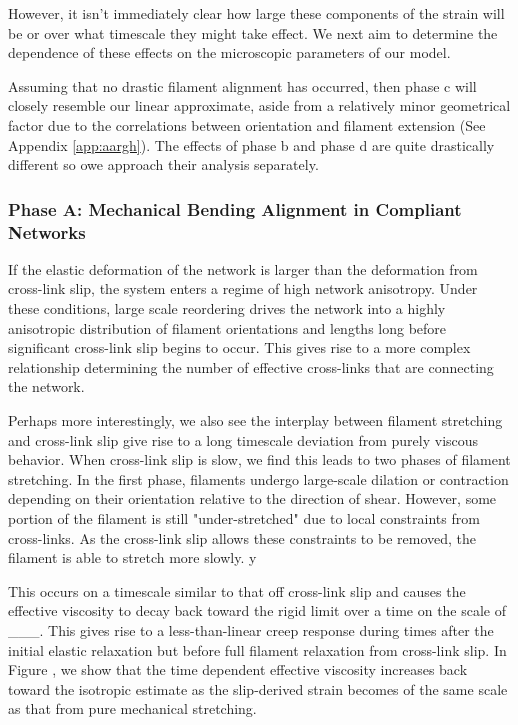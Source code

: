 \documentclass[pre,reprint]{revtex4-1}
\begin{document}
However, it isn't immediately clear how large these components of the strain will be or over what timescale they might take effect.  We next aim to determine the dependence of these effects on the microscopic parameters of our model.

Assuming that no drastic filament alignment has occurred, then phase c will closely resemble our linear approximate, aside from a relatively minor geometrical factor due to the correlations between orientation and filament extension (See Appendix \ref{app:aargh}).  The effects of phase b and phase d are quite drastically different so owe approach their analysis separately.

\subsubsection{Phase A: Mechanical Bending Alignment in Compliant Networks}
If the elastic deformation of the network is larger than the deformation from cross-link slip, the system enters a regime of high network anisotropy.  Under these conditions, large scale reordering drives the network into a highly anisotropic distribution of filament orientations and lengths long before significant cross-link slip begins to occur.  This gives rise to a more complex relationship determining the number of effective cross-links that are connecting the network.  

Perhaps more interestingly, we also see the interplay between filament stretching and cross-link slip give rise to a long timescale deviation from purely viscous behavior.  When cross-link slip is slow, we find this leads to two phases of filament stretching.  In the first phase, filaments undergo large-scale dilation or contraction depending on their orientation relative to the direction of shear.  However, some portion of the filament is still "under-stretched" due to local constraints from cross-links.  As the cross-link slip allows these constraints to be removed, the filament is able to stretch more slowly. y

This occurs on a timescale similar to that off cross-link slip and causes the effective viscosity to decay back toward the rigid limit over a time on the scale of \_\_\_.  This gives rise to a less-than-linear creep response during times after the initial elastic relaxation but before full filament relaxation from cross-link slip.  In Figure , we show that the time dependent effective viscosity increases back toward the isotropic estimate as the slip-derived strain becomes of the same scale as that from pure mechanical stretching.
\end{document}

